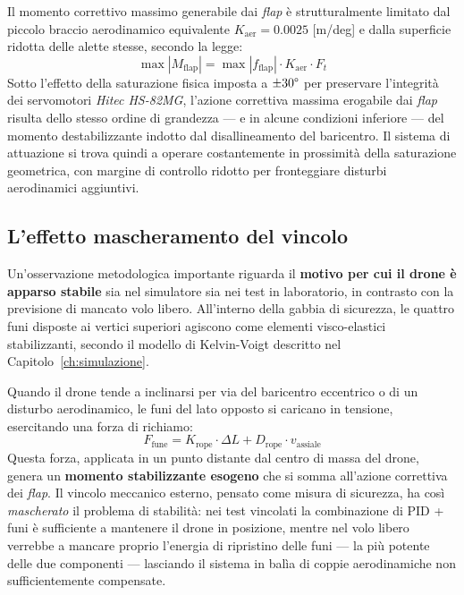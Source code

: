 \documentclass[11pt]{report}
\begin{document}
	Il momento correttivo massimo generabile dai \textit{flap} è strutturalmente limitato dal piccolo braccio aerodinamico equivalente $K_\text{aer} = 0.0025$ [m/deg] e dalla superficie ridotta delle alette stesse, secondo la legge:
	\begin{equation}
		\max\!\left| M_\text{flap} \right| = \max\!\left| f_\text{flap} \right| \cdot K_\text{aer} \cdot F_t
		\label{eq:autorita_flap}
	\end{equation}
	Sotto l'effetto della saturazione fisica imposta a $\pm 30\degree$ per preservare l'integrità dei servomotori \textit{Hitec HS-82MG}, l'azione correttiva massima erogabile dai \textit{flap} risulta dello stesso ordine di grandezza --- e in alcune condizioni inferiore --- del momento destabilizzante indotto dal disallineamento del baricentro. Il sistema di attuazione si trova quindi a operare costantemente in prossimità della saturazione geometrica, con margine di controllo ridotto per fronteggiare disturbi aerodinamici aggiuntivi.
	
	\subsection{L'effetto mascheramento del vincolo}
	\label{sec:masking_effect}
	Un'osservazione metodologica importante riguarda il \textbf{motivo per cui il drone è apparso stabile} sia nel simulatore sia nei test in laboratorio, in contrasto con la previsione di mancato volo libero. All'interno della gabbia di sicurezza, le quattro funi disposte ai vertici superiori agiscono come elementi visco-elastici stabilizzanti, secondo il modello di Kelvin-Voigt descritto nel Capitolo~\ref{ch:simulazione}.
	
	Quando il drone tende a inclinarsi per via del baricentro eccentrico o di un disturbo aerodinamico, le funi del lato opposto si caricano in tensione, esercitando una forza di richiamo:
	\begin{equation}
		F_\text{fune} = K_\text{rope} \cdot \Delta L + D_\text{rope} \cdot v_\text{assiale}
		\label{eq:forza_fune_cap7}
	\end{equation}
	Questa forza, applicata in un punto distante dal centro di massa del drone, genera un \textbf{momento stabilizzante esogeno} che si somma all'azione correttiva dei \textit{flap}. Il vincolo meccanico esterno, pensato come misura di sicurezza, ha così \textit{mascherato} il problema di stabilità: nei test vincolati la combinazione di PID + funi è sufficiente a mantenere il drone in posizione, mentre nel volo libero verrebbe a mancare proprio l'energia di ripristino delle funi --- la più potente delle due componenti --- lasciando il sistema in balìa di coppie aerodinamiche non sufficientemente compensate.
	
\end{document}

